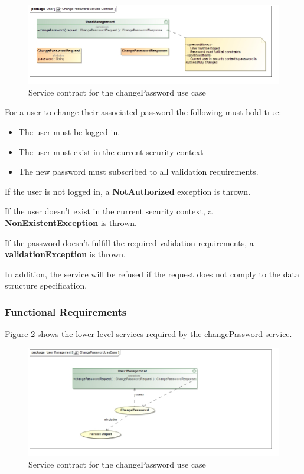 \begin{figure}[H]
  \begin{center}
  \includegraphics[scale=0.55]{../Diagrams and Charts/Users/Change Password Service Contract.jpg}
  \caption{Service contract for the changePassword use case}
  \label{fig:changePasswordServicesContract}
  \end{center}
\end{figure}

For a user to change their associated password the following must hold true:
\begin{itemize}
	\item The user must be logged in.
	\item The user must exist in the current security context
	\item The new password must subscribed to all validation requirements.
\end{itemize}

If the user is not logged in, a \textbf{NotAuthorized} exception is thrown.

If the user doesn't exist in the current security context, a \textbf{NonExistentException} is thrown.

If the password doesn't fulfill the required validation requirements, a \textbf{validationException} is thrown.

In addition, the service will be refused if the request does not comply to the data structure specification.

\subsubsection{Functional Requirements}
Figure \ref{fig:changePasswordUseCase} shows the lower level services required by the changePassword service.

\begin{figure}[H]
	\begin{center}
		\includegraphics[scale=0.55]{../Diagrams and Charts/Users/Change Password Use Case.jpg}
		\caption{Service contract for the changePassword use case}
		\label{fig:changePasswordUseCase}
	\end{center}
\end{figure}
